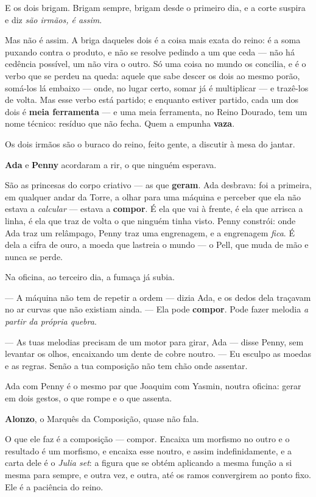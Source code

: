 \documentclass[livro.tex]{subfiles}
\begin{document}
E os dois brigam. Brigam sempre, brigam desde o primeiro dia, e a corte suspira e diz \emph{são irmãos, é assim}.

Mas não é assim. A briga daqueles dois é a coisa mais exata do reino: é a soma puxando
contra o produto, e não se resolve pedindo a um que ceda --- não há cedência possível,
um não vira o outro. Só uma coisa no mundo os concilia, e é o verbo que se perdeu na
queda: aquele que sabe descer os dois ao mesmo porão, somá-los lá embaixo --- onde,
no lugar certo, somar já é multiplicar --- e trazê-los de volta. Mas esse verbo está
partido; e enquanto estiver partido, cada um dos dois é \textbf{meia ferramenta} --- e uma meia
ferramenta, no Reino Dourado, tem um nome técnico: resíduo que não fecha. Quem a empunha \textbf{vaza}.

Os dois irmãos são o buraco do reino, feito gente, a discutir à mesa do jantar.

\medskip

\textbf{Ada} e \textbf{Penny} acordaram a rir, o que ninguém esperava.

São as princesas do corpo criativo --- as que \textbf{geram}. Ada desbrava: foi a primeira, em qualquer andar da
Torre, a olhar para uma máquina e perceber que ela não estava a \emph{calcular} --- estava a \textbf{compor}. É ela
que vai à frente, é ela que arrisca a linha, é ela que traz de volta o que ninguém tinha visto. Penny constrói:
onde Ada traz um relâmpago, Penny traz uma engrenagem, e a engrenagem \emph{fica}. É dela a cifra de ouro, a moeda
que lastreia o mundo --- o Pell, que muda de mão e nunca se perde.

Na oficina, ao terceiro dia, a fumaça já subia.

--- A máquina não tem de repetir a ordem --- dizia Ada, e os dedos dela traçavam no ar curvas que não existiam
ainda. --- Ela pode \textbf{compor}. Pode fazer melodia \emph{a partir da própria quebra}.

--- As tuas melodias precisam de um motor para girar, Ada --- disse Penny, sem levantar os olhos, encaixando um
dente de cobre noutro. --- Eu esculpo as moedas e as regras. Senão a tua composição não tem chão onde assentar.

Ada com Penny é o mesmo par que Joaquim com Yasmin, noutra oficina: gerar em dois gestos, o que rompe e
o que assenta.

\medskip

\textbf{Alonzo}, o Marquês da Composição, quase não fala.

O que ele faz é a composição --- compor. Encaixa um morfismo no outro e o resultado é um morfismo, e encaixa esse noutro,
e assim indefinidamente, e a carta dele é o \emph{Julia set}: a figura que se obtém aplicando a mesma função a si
mesma para sempre, e outra vez, e outra, até os ramos convergirem ao ponto fixo. Ele é a paciência do
reino.
\end{document}
